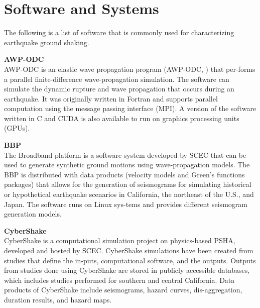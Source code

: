 \section{Software and Systems}
\label{sec:eq_shake_tools}

The following is a list of software that is commonly used for characterizing earthquake ground shaking.
\newline

\noindent\textbf{AWP-ODC} \\AWP-ODC is an elastic wave propagation program (AWP-ODC, \cite{cui2010scalable}) that per-forms a parallel finite-difference wave-propagation simulation. The software can simulate the dynamic rupture and wave propagation that occurs during an earthquake. It was originally written in Fortran and supports parallel computation using the message passing interface (MPI). A version of the software written in C and CUDA is also available to run on graphics processing units (GPUs).
\newline

\noindent\textbf{BBP} \\The Broadband platform \citep{maechling2015scec} is a software system developed by SCEC that can be used to generate synthetic ground motions using wave-propagation models. The BBP is distributed with data products (velocity models and Green’s functions packages) that allows for the generation of seismograms for simulating historical or hypothetical earthquake scenarios in California, the northeast of the U.S., and Japan. The software runs on Linux sys-tems and provides different seismogram generation models.
\newline

\noindent\textbf{CyberShake} \\CyberShake is a computational simulation project on physics-based PSHA, developed and hosted by SCEC. CyberShake simulations have been created from studies that define the in-puts, computational software, and the outputs. Outputs from studies done using CyberShake are stored in publicly accessible databases, which includes studies performed for southern and central California. Data products of CyberShake include seismograms, hazard curves, dis-aggregation, duration results, and hazard maps.
\newline

